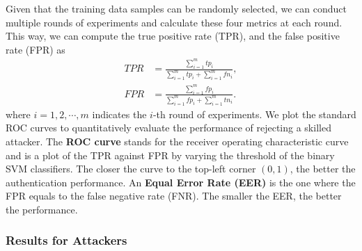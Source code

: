 Given that the training data samples can be randomly selected, we can conduct multiple rounds of experiments and calculate these four metrics at each round. This way, we can compute the true positive rate (TPR), and the false positive rate (FPR) as
\begin{align}
\nonumber TPR &= \frac{\sum_{i=1}^m tp_i}{\sum_{i=1}^m tp_i+\sum_{i=1}^m fn_i}, \\
\nonumber FPR &= \frac{\sum_{i=1}^m fp_i}{\sum_{i=1}^m fp_i+\sum_{i=1}^m tn_i}.
\end{align}
where $i=1,2,\cdots, m$ indicates the $i$-th round of experiments. We plot the standard ROC curves to quantitatively evaluate the performance of rejecting a skilled attacker. The \textbf{ROC curve} stands for the receiver operating characteristic curve and is a plot of the TPR against FPR by varying the threshold of the binary SVM classifiers. The closer the curve to the top-left corner $(0, 1)$, the better the authentication performance. An \textbf{Equal Error Rate (EER)} is the one where the FPR equals to the false negative rate (FNR). The smaller the EER, the better the performance.



%
% 




 
\subsubsection{Results for  Attackers}
\label{sec:para}

